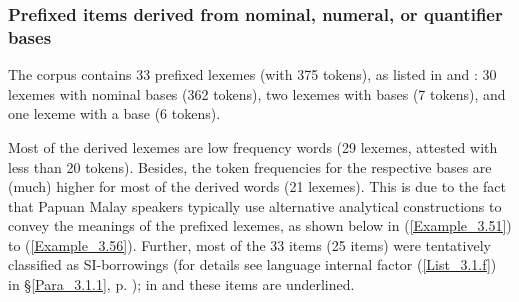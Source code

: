 \subsubsection[Prefixed items derived from nominal, {numeral}, or {quantifier} bases]{Prefixed items derived from nominal, {numeral}, or {quantifier} bases}\label{Para_3.1.5.3}

The corpus contains 33 prefixed lexemes (with 375 tokens), as listed in   and : 30 lexemes with nominal bases (362 tokens), two lexemes with  bases (7 tokens), and one lexeme with a  base (6 tokens).



Most of the derived lexemes are low frequency words (29 lexemes, attested with less than 20 tokens). Besides, the token frequencies for the respective bases are (much) higher for most of the derived words (21 lexemes). This is due to the fact that Papuan Malay speakers typically use alternative analytical constructions to convey the meanings of the prefixed lexemes, as shown below in (\ref{Example_3.51}) to (\ref{Example_3.56}). Further, most of the 33 items (25 items) were tentatively classified as SI-borrowings (for details see language internal factor (\ref{List_3.1.f}) in §\ref{Para_3.1.1}, p. \pageref{List_3.1.f}); in  and  these items are underlined.

